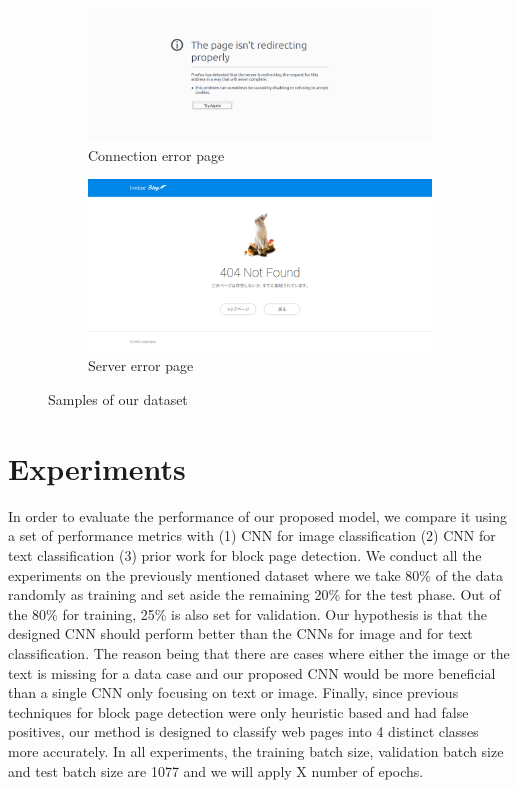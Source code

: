 \documentclass{article} %
\begin{document}
\begin{figure}
\begin{subfigure}[b]{0.2\textwidth}
        \centering
        \includegraphics[width=\textwidth]{connectionerr.png}
        \caption{Connection error page}
        \label{fig:connectionerror}
    \end{subfigure}
    \hfill
    \begin{subfigure}[b]{0.2\textwidth}
        \centering
        \includegraphics[width=\textwidth]{servererr.png}
        \caption{Server error page}
        \label{fig:servererror}
    \end{subfigure}
    \caption{Samples of our dataset}
    \label{fig:sample_dataset}
\end{figure}
\section{Experiments}
\label{experiments}
In order to evaluate the performance of our proposed model, we compare it using a set of performance metrics with (1) CNN for image classification (2) CNN for text classification (3) prior work for block page detection. We conduct all the experiments on the previously mentioned dataset where we take 80\% of the data randomly as training and set aside the remaining 20\% for the test phase. Out of the 80\% for training, 25\% is also set for validation. Our hypothesis is that the designed CNN should perform better than the CNNs for image and for text classification. The reason being that there are cases where either the image or the text is missing for a data case and our proposed CNN would be more beneficial than a single CNN only focusing on text or image. Finally, since previous techniques for block page detection were only heuristic based and had false positives, our method is designed to classify web pages into 4 distinct classes more accurately. In all experiments, the training batch size, validation batch size and test batch size are 1077 and we will apply X number of epochs.
\end{document}
